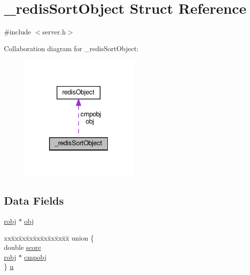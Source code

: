 \hypertarget{struct__redis_sort_object}{}\section{\+\_\+redis\+Sort\+Object Struct Reference}
\label{struct__redis_sort_object}


{\ttfamily \#include $<$server.\+h$>$}



Collaboration diagram for \+\_\+redis\+Sort\+Object\+:
\nopagebreak
\begin{figure}[H]
\begin{center}
\leavevmode
\includegraphics[width=169pt]{struct__redis_sort_object__coll__graph}
\end{center}
\end{figure}
\subsection*{Data Fields}
\begin{DoxyCompactItemize}
\item 
\hyperlink{server_8h_a540f174d2685422fbd7d12e3cd44c8e2}{robj} $\ast$ \hyperlink{struct__redis_sort_object_ab823bb3761b604174d6c31727a47bebc}{obj}
\item 
\begin{tabbing}
xx\=xx\=xx\=xx\=xx\=xx\=xx\=xx\=xx\=\kill
union \{\\
\>double \hyperlink{struct__redis_sort_object_a40a24ec85daa9ac70aa74e4ca744f838}{score}\\
\>\hyperlink{server_8h_a540f174d2685422fbd7d12e3cd44c8e2}{robj} $\ast$ \hyperlink{struct__redis_sort_object_a5a84c8f22865dd4299870240e1db9f58}{cmpobj}\\
\} \hyperlink{struct__redis_sort_object_a27255f4355dc7226770c0682f29744b0}{u}\\

\end{tabbing}\end{DoxyCompactItemize}


